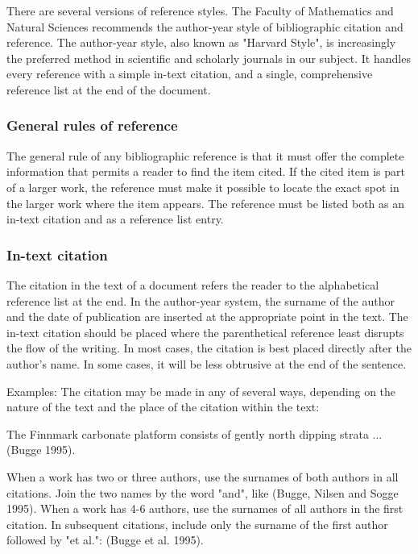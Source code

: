 There are several versions of reference styles. The Faculty of Mathematics and Natural Sciences recommends the author-year style of bibliographic citation and reference. The author-year style, also known as "Harvard Style", is increasingly the preferred method in scientific and scholarly journals in our subject. It handles every reference with a simple in-text citation, and a single, comprehensive reference list at the end of the document.

\subsubsection{General rules of reference}

The general rule of any bibliographic reference is that it must offer the complete information that permits a reader to find the item cited. If the cited item is part of a larger work, the reference must make it possible to locate the exact spot in the larger work where the item appears. The reference must be listed both as an in-text citation and as a reference list entry.

\subsubsection{In-text citation}

The citation in the text of a document refers the reader to the alphabetical reference list at the end. In the author-year system, the surname of the author and the date of publication are inserted at the appropriate point in the text. The in-text citation should be placed where the parenthetical reference least disrupts the flow of the writing. In most cases, the citation is best placed directly after the author’s name. In some cases, it will be less obtrusive at the end of the sentence.

Examples: The citation may be made in any of several ways, depending on the nature of the text and the place of the citation within the text:

The Finnmark carbonate platform consists of gently north dipping strata ... (Bugge 1995).

When a work has two or three authors, use the surnames of both authors in all citations. Join the two names by the word "and", like (Bugge, Nilsen and Sogge 1995). When a work has 4-6 authors, use the surnames of all authors in the first citation. In subsequent citations, include only the surname of the first author followed by "et al.": (Bugge et al. 1995).

